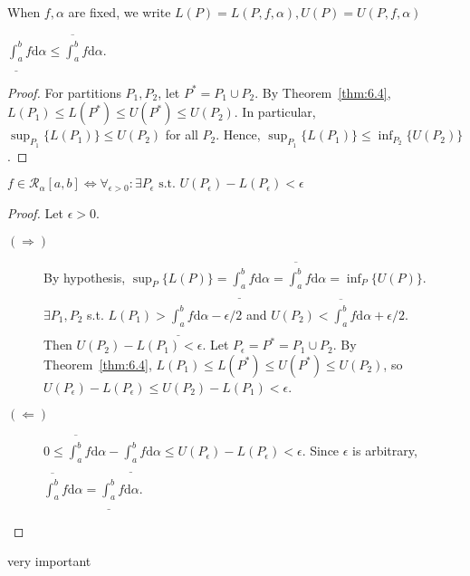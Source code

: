 \begin{notation}
	When $f,\alpha$ are fixed, we write $L(P)=L(P,f,\alpha),U(P)=U(P,f,\alpha)$
\end{notation}

\begin{thm}[5]
	$\underline{\int_{a}^{b}}{f\mathrm{d}\alpha}\le  \overline{\int_{a}^{b}}{f\mathrm{d}\alpha}$.
	\begin{proof}
		For partitions $P_1,P_2$, let $P^{*}=P_1 \cup P_2$.
		By Theorem~\ref{thm:6.4}, $L(P_1)\le L(P^{*})\le U(P^{*})\le U(P_2)$.
		In particular, $\sup_{P_1}\{L(P_1)\}\le U(P_2)$ for all $P_2$.
		Hence, $\sup_{P_1}\{L(P_1)\}\le \inf_{P_2}\{U(P_2)\}$.
	\end{proof}
\end{thm}
\begin{thm}[6]
	$f \in \mathscr{R}_{\alpha}[a,b]\Leftrightarrow \forall_{\epsilon > 0}: \exists P_{\epsilon} \text{ s.t. } U(P_{\epsilon})-L(P_{\epsilon})<\epsilon$
	\begin{proof}
		Let $\epsilon>0$.
		\begin{description}
			\item[$(\Rightarrow)$]
			      By hypothesis, $\sup_{P}\{L(P)\}= \underline{\int_{a}^{b}}f\mathrm{d}\alpha=\overline{\int_{a}^{b}}f\mathrm{d}\alpha=\inf_{P}\{U(P)\}$.\\
			      $\exists P_1,P_2$ s.t. $L(P_1)>\underline{\int_{a}^{b}}f\mathrm{d}\alpha-\epsilon/2$ and $U(P_2)<\overline{\int_{a}^{b}}f\mathrm{d}\alpha+\epsilon/2$.\\
			      Then $U(P_{2})-L(P_{1})<\epsilon$. Let $P_{\epsilon}=P^{*}=P_{1}\cup P_{2}$.
			      By Theorem~\ref{thm:6.4}, $L(P_{1})\le L(P^{*})\le U(P^{*})\le U(P_{2})$, so $U(P_{\epsilon})-L(P_{\epsilon})\le U(P_2)-L(P_1)<\epsilon$.
			\item[$(\Leftarrow)$]
			      $0\le \overline{\int_{a}^{b}}{f\mathrm{d}\alpha} - \underline{\int_{a}^{b}}{f\mathrm{d}\alpha}\le U(P_{\epsilon})-L(P_{\epsilon})<\epsilon$. Since $\epsilon$ is arbitrary, $\overline{\int_{a}^{b}}{f\mathrm{d}\alpha} = \underline{\int_{a}^{b}}{f\mathrm{d}\alpha}$.
		\end{description}
	\end{proof}
	\begin{remark}
		very important
	\end{remark}
\end{thm}

